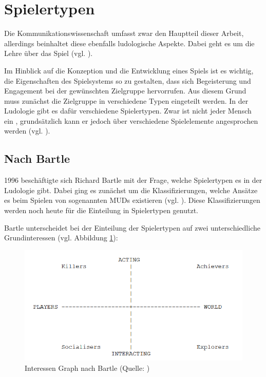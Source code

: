 \section{Spielertypen}
Die Kommunikationswissenschaft umfasst zwar den Hauptteil dieser Arbeit, allerdings beinhaltet diese ebenfalls ludologische Aspekte. Dabei geht es um die Lehre über das Spiel (vgl. \cite{ludologie_spielforschung_nodate}). 

Im Hinblick auf die Konzeption und die Entwicklung eines Spiels ist es wichtig, die Eigenschaften des Spielsystems so zu gestalten, dass sich Begeisterung und Engagement bei der gewünschten Zielgruppe hervorrufen. Aus diesem Grund muss zunächst die Zielgruppe in verschiedene Typen eingeteilt werden. In der Ludologie gibt es dafür verschiedene Spielertypen. Zwar ist nicht jeder Mensch ein , grundsätzlich kann er jedoch über verschiedene Spielelemente angesprochen werden (vgl. \cite{ludologie_spielertypen_nodate}).

\subsection{Nach Bartle}
1996 beschäftigte sich Richard Bartle mit der Frage, welche Spielertypen es in der Ludologie gibt. Dabei ging es zunächst um die Klassifizierungen, welche Ansätze es beim Spielen von sogenannten \ac{MUD}s existieren (vgl. \cite{bartle_hearts_1996}). Diese Klassifizierungen werden noch heute für die Einteilung in Spielertypen genutzt.

Bartle unterscheidet bei der Einteilung der Spielertypen auf zwei unterschiedliche Grundinteressen (vgl. Abbildung \ref{fig:bartle-muds}):

\begin{figure}[ht]
\centering
\includegraphics[width=1\linewidth]{content/pictures/basic_interests.PNG}
\caption{Interessen Graph nach Bartle (Quelle: \cite{bartle_hearts_1996})}
\label{fig:bartle-muds}
\end{figure}

